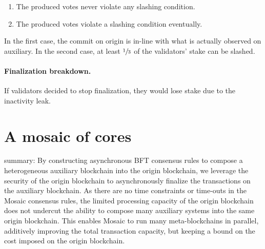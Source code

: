 \documentclass[12pt,a4paper]{article}
\begin{document}
\begin{enumerate}
    \item The produced votes never violate any slashing condition.
    \item The produced votes violate a slashing condition eventually.
\end{enumerate}

In the first case, the commit on origin is in-line with what is actually observed on auxiliary.
In the second case, at least $\sfrac{1}{3}$ of the validators' stake can be slashed.

\paragraph{Finalization breakdown.}
If validators decided to stop finalization, they would lose stake due to the inactivity leak.


%
%
\section{A mosaic of cores}

summary:
By constructing asynchronous BFT consensus rules to compose a heterogeneous auxiliary blockchain into the origin blockchain, we leverage the security of the origin blockchain to asynchronously finalize the transactions on the auxiliary blockchain.
As there are no time constraints or time-outs in the Mosaic consensus rules, the limited processing capacity of the origin blockchain does not undercut the ability to compose many auxiliary systems into the same origin blockchain.
This enables Mosaic to run many meta-blockchains in parallel, additively improving the total transaction capacity, but keeping a bound on the cost imposed on the origin blockchain.
%
%
\end{document}
